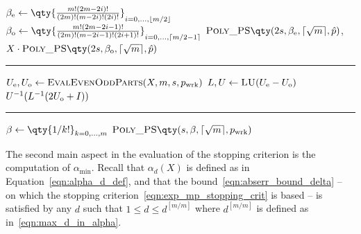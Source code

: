 \begin{algorithm}[hbp]
	\caption{\emph{Functions to evaluate the approximant of the matrix exponential; and auxiliary function to evaluate the even and odd parts of its numerator at a given precision $\hat{p}$. The function \emph{\textsc{Poly\_PS}} is in Algorithm~\ref{alg:exp_mp_paterson_stockmeyer}.}}
	\label{alg:eval_approximant}
	\begin{algorithmic}[1]
		\State $\beta_{\textup{e}}\gets\qty{\frac{m!(2m-2i)!}{(2m)!(m-2i)!(2i)!}}_{i=0,\dots,\lfloor m/2\rfloor}$
		\State $\beta_{\textup{o}}\gets\qty{\frac{m!(2m-2i-1)!}{(2m)!(m-2i-1)!(2i+1)!}}_{i=0,\dots,\lceil m/2-1\rceil}$
		\State\Return $\textsc{Poly\_PS}\qty(2s,\beta_{\textup{e}},\lceil\sqrt{m}\rceil,\hat{p})$, $X\cdot\textsc{Poly\_PS}\qty(2s,\beta_{\textup{o}},\lceil\sqrt{m}\rceil,\hat{p})$
		\EndFunction
	\end{algorithmic}
	\hrule
	\begin{algorithmic}[1]
			\State $U_{\textup{e}}, U_{\textup{o}}\gets\textsc{EvalEvenOddParts}(X,m,s,p_{\textup{wrk}})$
			\State $L,U\gets\textsc{LU}(U_{\textup{e}}-U_{\textup{o}})$
			\State \Return $U^{-1}(L^{-1}(2U_{\textup{o}}+I))$
		\EndFunction
	\end{algorithmic}
	\hrule
	\begin{algorithmic}[1]
			\State $\beta\gets\qty{1/k!}_{k=0,\dots,m}$
			\State \Return $\textsc{Poly\_PS}\qty(s,\beta,\lceil\sqrt{m}\rceil,p_{\textup{wrk}})$
		\EndFunction
	\end{algorithmic}
\end{algorithm}

The second main aspect in the evaluation of the stopping criterion is the computation of $\alpha_{\min}$. %
Recall that $\alpha_d(X)$ is defined as in Equation~\eqref{eqn:alpha_d_def}, and that the bound~\eqref{eqn:abserr_bound_delta} -- on which the stopping criterion~\eqref{eqn:exp_mp_stopping_crit} is based -- is satisfied by any $d$ such that $1\le d\le d^{[m/m]}$ where $d^{[m/m]}$ is defined as in~\eqref{eqn:max_d_in_alpha}.

